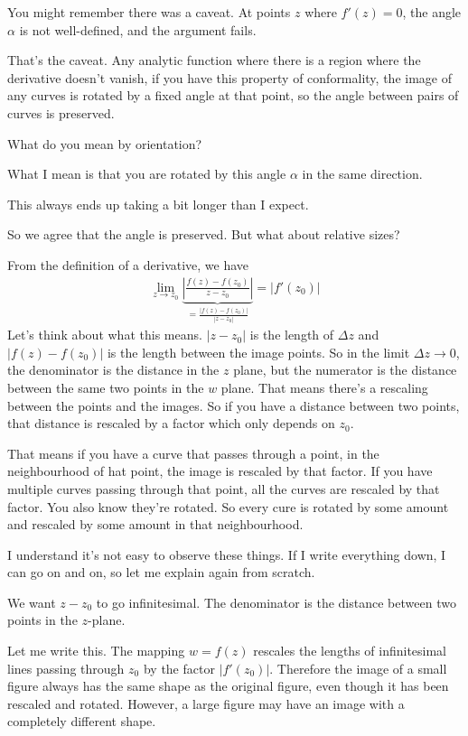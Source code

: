 You might remember there was a caveat.
At points $z$ where $f'(z)=0$,
the angle $\alpha$ is not well-defined,
and the argument fails.

That's the caveat.
Any analytic function where there is a region where the derivative doesn't
vanish,
if you have this property of conformality,
the image of any curves is rotated by a fixed angle at that point,
so the angle between pairs of curves is preserved.

\begin{question}
    What do you mean by orientation?
\end{question}
What I mean is that you are rotated by this angle $\alpha$ in the same
direction.

This always ends up taking a bit longer than I expect.

So we agree that the angle is preserved.
But what about relative sizes?

From the definition of a derivative,
we have
\begin{align}
    \lim_{z\to z_0}
    \underbrace{\left|
        \frac{f(z) - f(z_0)}{z - z_0}
    \right|}_{
        = \frac{|f(z) - f(z_0)|}{|z - z_0|}
    }
    =
    |f'(z_0)|
\end{align}
Let's think about what this means.
$|z - z_0|$ is the length of $\Delta z$
and $|f(z) - f(z_0)|$ is the length between the image points.
So in the limit $\Delta z\to 0$,
the denominator is the distance in the $z$ plane,
but the numerator is the distance between the same two points in the $w$ plane.
That means there's a rescaling between the points and the images.
So if you have a distance between two points,
that distance is rescaled by a factor
which only depends on $z_0$.

That means if you have a curve that passes through a point,
in the neighbourhood of hat point,
the image is rescaled by that factor.
If you have multiple curves passing through that point,
all the curves are rescaled by that factor.
You also know they're rotated.
So every cure is rotated by some amount
and rescaled by some amount
in that neighbourhood.

I understand it's not easy to observe these things.
If I write everything down,
I can go on and on,
so let me explain again from scratch.

We want $z-z_0$ to go infinitesimal.
The denominator is the distance between two points in the $z$-plane.

Let me write this.
The mapping $w=f(z)$ rescales the lengths of infinitesimal lines passing through
$z_0$ by the factor $|f'(z_0)|$.
Therefore the image of a small figure always has the same shape as the original
figure,
even though it has been rescaled and rotated.
However, a large figure may have an image with a completely different shape.

